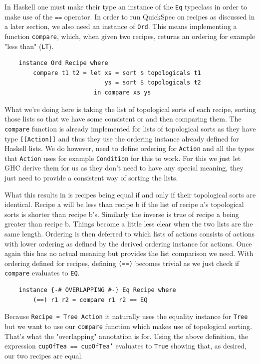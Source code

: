 \documentclass[11pt]{article}
\begin{document}
In Haskell one must make their type an instance of the \texttt{Eq} typeclass in
order to make use of the \texttt{==} operator. In order to run QuickSpec on recipes
as discussed in a later section, we also need an instance of \texttt{Ord}.
This means implementing a function \texttt{compare}, which, when given two recipes,
returns an ordering for example "less than" (\texttt{LT}).

\begin{lstlisting}
    instance Ord Recipe where
        compare t1 t2 = let xs = sort $ topologicals t1
                            ys = sort $ topologicals t2
                         in compare xs ys
\end{lstlisting}

What we're doing here is taking the list of topological sorts of each recipe, sorting those
lists so that we have some consistent or and then comparing them. The \texttt{compare} function
is already implemented for lists of topological sorts as they have type \texttt{[[Action]]}
and thus they use the ordering instance already defined for Haskell lists. We do however,
need to define ordering for \texttt{Action} and all the types that \texttt{Action} uses
for example \texttt{Condition} for this to work. For this we just let GHC derive them for
us as they don't need to have any special meaning, they just need to provide a consistent
way of sorting the lists.

\medbreak

What this results in is recipes being equal if and only if their topological sorts are identical.
Recipe a will be less than recipe b if the list of recipe a's topological sorts is shorter than recipe b's.
Similarly the inverse is true of recipe a being greater than recipe b. Things become a little less
clear when the two lists are the same length. Ordering is then deferred to which lists of actions
consists of actions with lower ordering as defined by the derived ordering instance for actions.
Once again this has no actual meaning but provides the list comparison we need. With ordering defined for recipes,
defining \texttt{(==)} becomes trivial as we just check if \texttt{compare} evaluates to \texttt{EQ}.

\begin{lstlisting}
    instance {-# OVERLAPPING #-} Eq Recipe where
        (==) r1 r2 = compare r1 r2 == EQ
\end{lstlisting}

Because \texttt{Recipe = Tree Action} it naturally uses the equality instance for
\texttt{Tree} but we want to use our \texttt{compare} function which makes use of topological sorting.
That's what the "overlapping" annotation is for. Using the above definition, the expression
\texttt{cupOfTea == cupOfTea'} evaluates to \texttt{True} showing that, as desired, our two recipes are equal.
\end{document}
